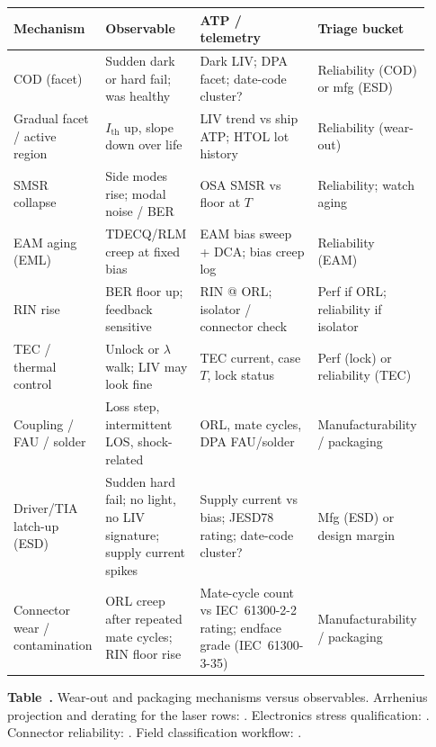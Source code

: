 \begin{table}[ht]
\label{tab:wearout-map}%
\centering
\setlength{\tabcolsep}{3pt}%
\footnotesize
\renewcommand{\arraystretch}{1.25}%
\begin{tabular}{@{}p{0.16\linewidth}p{0.22\linewidth}p{0.28\linewidth}p{0.26\linewidth}@{}}
\toprule
Mechanism & Observable & ATP / telemetry & Triage bucket \\
\midrule
COD (facet) & Sudden dark or hard fail; was healthy & Dark LIV; DPA facet; date-code cluster? & Reliability (COD) or mfg (ESD) \\
\addlinespace[1.5em]
Gradual facet / active region & $I_\mathrm{th}$ up, slope down over life & LIV trend vs ship ATP; HTOL lot history & Reliability (wear-out) \\
\addlinespace[1.5em]
SMSR collapse & Side modes rise; modal noise / BER & OSA SMSR vs floor at $T$ & Reliability; watch aging \\
\addlinespace[1.5em]
EAM aging (EML) & TDECQ/RLM creep at fixed bias & EAM bias sweep + DCA; bias creep log & Reliability (EAM) \\
\addlinespace[1.5em]
RIN rise & BER floor up; feedback sensitive & RIN @ ORL; isolator / connector check & Perf if ORL; reliability if isolator \\
\addlinespace[1.5em]
TEC / thermal control & Unlock or $\lambda$ walk; LIV may look fine & TEC current, case $T$, lock status & Perf (lock) or reliability (TEC) \\
\addlinespace[1.5em]
Coupling / FAU / solder & Loss step, intermittent LOS, shock-related & ORL, mate cycles, DPA FAU/solder & Manufacturability / packaging \\
\addlinespace[1.5em]
Driver/TIA latch-up (ESD) & Sudden hard fail; no light, no LIV signature; supply current spikes & Supply current vs bias; JESD78 rating; date-code cluster? & Mfg (ESD) or design margin \\
\addlinespace[1.5em]
Connector wear / contamination & ORL creep after repeated mate cycles; RIN floor rise & Mate-cycle count vs IEC~61300-2-2 rating; endface grade (IEC~61300-3-35) & Manufacturability / packaging \\
\bottomrule
\end{tabular}
\par\medskip
{\raggedright\footnotesize\textbf{Table~\thetable.} Wear-out and packaging mechanisms
versus observables. Arrhenius projection and derating for the laser rows:
. Electronics stress qualification:
. Connector reliability: .
Field classification workflow: .\par}
\end{table}
\FloatBarrier

